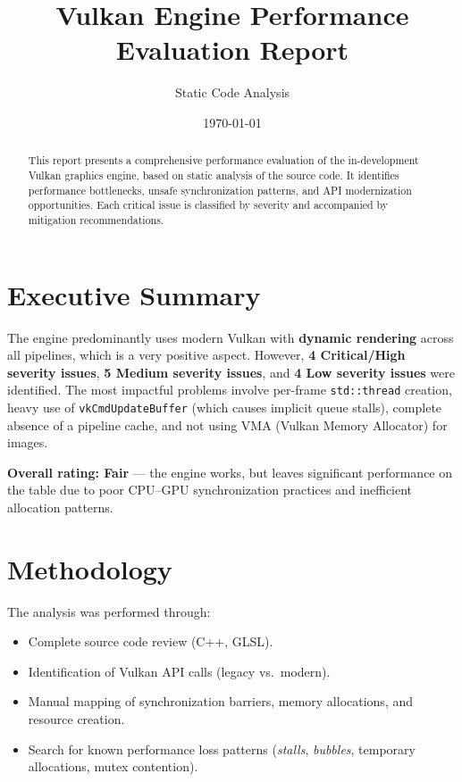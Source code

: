 \documentclass[a4paper,10pt]{article}
\title{\textbf{Vulkan Engine Performance Evaluation Report}}
\author{Static Code Analysis}
\date{\today}
\begin{document}
\maketitle

\begin{abstract}
This report presents a comprehensive performance evaluation of the in-development Vulkan
graphics engine, based on static analysis of the source code. It identifies performance
bottlenecks, unsafe synchronization patterns, and API modernization opportunities. Each
critical issue is classified by severity and accompanied by mitigation recommendations.
\end{abstract}

\tableofcontents
\newpage

\section{Executive Summary}

The engine predominantly uses modern Vulkan with \textbf{dynamic rendering} across all
pipelines, which is a very positive aspect. However, \textbf{4 Critical/High severity
issues}, \textbf{5 Medium severity issues}, and \textbf{4 Low severity issues} were
identified. The most impactful problems involve per-frame \texttt{std::thread} creation,
heavy use of \texttt{vkCmdUpdateBuffer} (which causes implicit queue stalls), complete
absence of a pipeline cache, and not using VMA (Vulkan Memory Allocator) for images.

\vspace{0.5em}
\noindent
\textbf{Overall rating: \textcolor{medium}{Fair}} --- the engine works, but leaves
significant performance on the table due to poor CPU--GPU synchronization practices and
inefficient allocation patterns.

\section{Methodology}

The analysis was performed through:
\begin{itemize}[nosep]
    \item Complete source code review (C++, GLSL).
    \item Identification of Vulkan API calls (legacy vs.\ modern).
    \item Manual mapping of synchronization barriers, memory allocations, and resource
          creation.
    \item Search for known performance loss patterns (\textit{stalls}, \textit{bubbles},
          temporary allocations, mutex contention).
\end{itemize}
\end{document}
